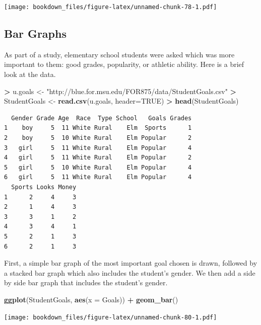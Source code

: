 \documentclass[]{krantz}
\makeatletter
\newenvironment{Shaded}{\begin{snugshade}}{\end{snugshade}}
\newcommand{\KeywordTok}[1]{\textcolor[rgb]{0.27,0.27,0.27}{\textbf{#1}}}
\newcommand{\DataTypeTok}[1]{\textcolor[rgb]{0.27,0.27,0.27}{#1}}
\newcommand{\StringTok}[1]{\textcolor[rgb]{0.5,0.5,0.5}{#1}}
\newcommand{\OtherTok}[1]{\textcolor[rgb]{0.37,0.37,0.37}{#1}}
\newcommand{\OperatorTok}[1]{\textcolor[rgb]{0.43,0.43,0.43}{\textbf{#1}}}
\newcommand{\NormalTok}[1]{#1}
\newenvironment{kframe}{%
\medskip{}
\setlength{\fboxsep}{.8em}
 \def\at@end@of@kframe{}%
 \ifinner\ifhmode%
  \def\at@end@of@kframe{\end{minipage}}%
  \begin{minipage}{\columnwidth}%
 \fi\fi%
 \def\FrameCommand##1{\hskip\@totalleftmargin \hskip-\fboxsep
 \colorbox{shadecolor}{##1}\hskip-\fboxsep
     \hskip-\linewidth \hskip-\@totalleftmargin \hskip\columnwidth}%
 \MakeFramed {\advance\hsize-\width
   \@totalleftmargin\z@ \linewidth\hsize
   \@setminipage}}%
 {\par\unskip\endMakeFramed%
 \at@end@of@kframe}
\renewenvironment{Shaded}{\begin{kframe}}{\end{kframe}}
\makeatother
\begin{document}
\texttt{[image: bookdown\_files/figure-latex/unnamed-chunk-78-1.pdf]}

\subsection{Bar Graphs}\label{bar-graphs}

As part of a study, elementary school students were asked which was more
important to them: good grades, popularity, or athletic ability. Here is
a brief look at the data.

\begin{Shaded}
\begin{Highlighting}[]
\OperatorTok{>}\StringTok{ }\NormalTok{u.goals <-}\StringTok{ "http://blue.for.msu.edu/FOR875/data/StudentGoals.csv"}
\OperatorTok{>}\StringTok{ }\NormalTok{StudentGoals <-}\StringTok{ }\KeywordTok{read.csv}\NormalTok{(u.goals, }\DataTypeTok{header=}\OtherTok{TRUE}\NormalTok{)}
\OperatorTok{>}\StringTok{ }\KeywordTok{head}\NormalTok{(StudentGoals)}
\end{Highlighting}
\end{Shaded}

\begin{verbatim}
  Gender Grade Age  Race  Type School   Goals Grades
1    boy     5  11 White Rural    Elm  Sports      1
2    boy     5  10 White Rural    Elm Popular      2
3   girl     5  11 White Rural    Elm Popular      4
4   girl     5  11 White Rural    Elm Popular      2
5   girl     5  10 White Rural    Elm Popular      4
6   girl     5  11 White Rural    Elm Popular      4
  Sports Looks Money
1      2     4     3
2      1     4     3
3      3     1     2
4      3     4     1
5      2     1     3
6      2     1     3
\end{verbatim}

First, a simple bar graph of the most important goal chosen is drawn,
followed by a stacked bar graph which also includes the student's
gender. We then add a side by side bar graph that includes the student's
gender.

\begin{Shaded}
\begin{Highlighting}[]
\KeywordTok{ggplot}\NormalTok{(StudentGoals, }\KeywordTok{aes}\NormalTok{(}\DataTypeTok{x =}\NormalTok{ Goals)) }\OperatorTok{+}\StringTok{ }\KeywordTok{geom_bar}\NormalTok{()}
\end{Highlighting}
\end{Shaded}

\texttt{[image: bookdown\_files/figure-latex/unnamed-chunk-80-1.pdf]}
\end{document}
